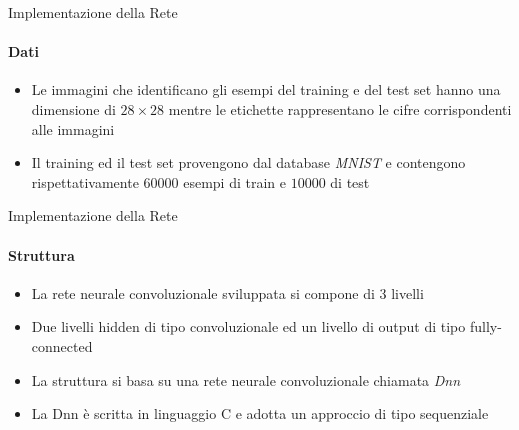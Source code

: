 \documentclass[
 ]{beamer}
\begin{document}
\begin{frame}{Implementazione della Rete}
    \framesubtitle{Dati}
    \begin{itemize} [<+->]
        \setlength\itemsep{3em}
        \item \large Le immagini che identificano gli esempi del training e del test set hanno una dimensione di $28 \times 28$ mentre le etichette rappresentano le cifre corrispondenti alle immagini
        \item \large Il training ed il test set provengono dal database \emph{MNIST} e contengono rispettativamente $60000$ esempi di train e $10000$ di test 
    \end{itemize}
\end{frame}


\begin{frame}{Implementazione della Rete}
    \framesubtitle{Struttura}
    \begin{itemize} [<+->]
        \setlength\itemsep{2.5em}
        \item \large La rete neurale convoluzionale sviluppata si compone di 3 livelli
        \item \large Due livelli hidden di tipo convoluzionale ed un livello di output di tipo fully-connected
        \item \large La struttura si basa su una rete neurale convoluzionale chiamata \emph{Dnn} 
        \item \large La Dnn è scritta in linguaggio C e adotta un approccio di tipo sequenziale
    \end{itemize}
\end{frame}
\end{document}
